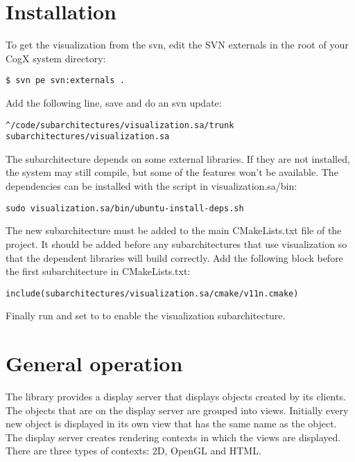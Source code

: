 
\section{Installation}

To get the visualization from the svn, edit the SVN externals in the root
of your CogX system directory:

\begin{Verbatim}[fontsize=\scriptsize,gobble=3]
   $ svn pe svn:externals .
\end{Verbatim}

Add the following line, save and do an svn update:

\begin{Verbatim}[fontsize=\scriptsize,gobble=3]
   ^/code/subarchitectures/visualization.sa/trunk subarchitectures/visualization.sa
\end{Verbatim}

The subarchitecture depends on some external libraries. If they are not
installed, the system may still compile, but some of the features won't be
available. The dependencies can be installed with the script in
visualization.sa/bin: 

\begin{Verbatim}[fontsize=\scriptsize,gobble=3]
   sudo visualization.sa/bin/ubuntu-install-deps.sh
\end{Verbatim}

The new subarchitecture must be added to the main CMakeLists.txt file of the 
project. It should be added before any subarchitectures that use visualization
so that the dependent libraries will build correctly. Add the following
block before the first subarchitecture in CMakeLists.txt:

\begin{Verbatim}[fontsize=\scriptsize,gobble=3]
   include(subarchitectures/visualization.sa/cmake/v11n.cmake)
\end{Verbatim}

Finally run  and set  to  to enable
the visualization subarchitecture.


\section{General operation}

The library provides a display server that displays objects created by its
clients.  The objects that are on the display server are grouped into views.
Initially every new object is displayed in its own view that has the same name
as the object.
The display server creates rendering contexts in which the views are displayed.
There are three types of contexts: 2D, OpenGL and HTML.

